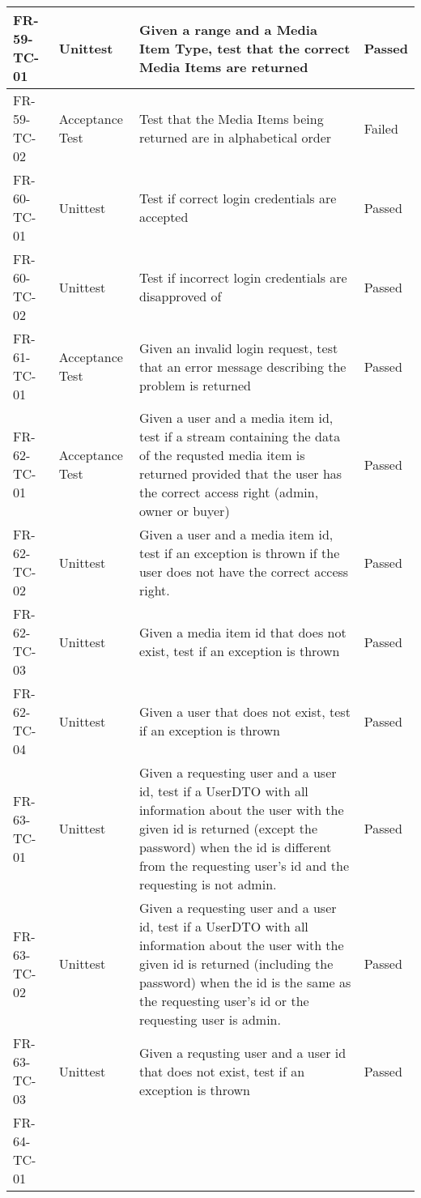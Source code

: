 \documentclass[../report.tex]{subfiles}
\begin{document}
\begin{longtable}{|L{2.1cm}|L{3cm}|C{7.5cm}|L{3cm}|}
FR-59-TC-01&Unittest&Given a range and a Media Item Type,  test that the correct Media Items are returned&Passed  \\ \hline
FR-59-TC-02&Acceptance Test&Test that the Media Items being returned are in alphabetical order&Failed  \\ \hline
FR-60-TC-01&Unittest&Test if correct login credentials are accepted&Passed  \\ \hline
FR-60-TC-02&Unittest&Test if incorrect login credentials are disapproved of&Passed  \\ \hline
FR-61-TC-01&Acceptance Test&Given an invalid login request, test that an error message describing the problem is returned&Passed  \\ \hline
FR-62-TC-01&Acceptance Test&Given a user and a media item id, test if a stream containing the data of the requsted media item is returned provided that the user has the correct access right (admin, owner or buyer)&Passed  \\ \hline
FR-62-TC-02&Unittest&Given a user and a media item id, test if an exception is thrown if the user does not have the correct access right.&Passed  \\ \hline
FR-62-TC-03&Unittest&Given a media item id that does not exist, test if an exception is thrown&Passed  \\ \hline
FR-62-TC-04&Unittest&Given a user that does not exist, test if an exception is thrown&Passed  \\ \hline
FR-63-TC-01&Unittest&Given a requesting user and a user id, test if a UserDTO with all information about the user with the given id is returned (except the password) when the id is different from the requesting user's id and the requesting is not admin.&Passed  \\ \hline
FR-63-TC-02&Unittest&Given a requesting user and a user id, test if a UserDTO with all information about the user with the given id is returned (including the password) when the id is the same as the requesting user's id or the requesting user is admin.&Passed  \\ \hline
FR-63-TC-03&Unittest&Given a requsting user and a user id that does not exist, test if an exception is thrown&Passed  \\ \hline
FR-64-TC-01  \\ \hline

\end{longtable}
\end{document}
